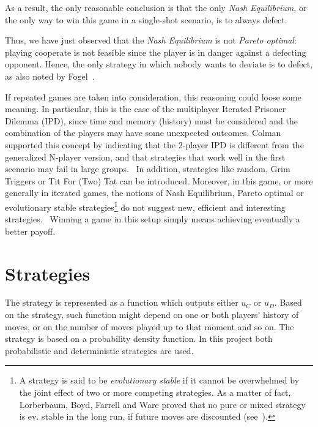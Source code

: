 \documentclass[journal,10pt,twoside]{IEEEtran}
\begin{document}
As a result, the only reasonable conclusion is that the only \textit{Nash Equilibrium}, or the only way to win this game in a single-shot scenario, is to always defect.

Thus, we have just observed that the \textit{Nash Equilibrium} is not \textit{Pareto optimal}: playing cooperate is not feasible since the player is in danger against a defecting opponent. Hence, the only strategy in which nobody wants to deviate is to defect, as also noted by Fogel~\cite{fogelEvolvingBehaviors}.

If repeated games are taken into consideration, this reasoning could loose some meaning. In particular, this is the case of the multiplayer Iterated Prisoner Dilemma (IPD), since time and memory (history) must be considered and the combination of the players may have some unexpected outcomes.
Colman supported this concept by indicating that the 2-player IPD is different from the generalized N-player version, and that strategies that work well in the first scenario may fail in large groups.~\cite{yao1994experimental}
In addition, strategies like random, Grim Triggers or Tit For (Two) Tat can be introduced.
Moreover, in this game, or more generally in iterated games, the notions of Nash Equilibrium, Pareto optimal or evolutionary stable strategies\footnote{A strategy is said to be \textit{evolutionary stable} if it cannot be overwhelmed by the joint effect of two or more competing strategies. As a matter of fact, Lorberbaum, Boyd, Farrell and Ware proved that no pure or mixed strategy is ev. stable in the long run, if future moves are discounted (see~\cite{lorb94}).} do not suggest new, efficient and interesting strategies.~\cite{mathieu2017}
Winning a game in this setup simply means achieving eventually a better payoff.

\section{Strategies} \label{s:str}
The strategy is represented as a function which outputs either $u_C$ or $u_D$. Based on the strategy, such function might depend on one or both players' history of moves, or on the number of moves played up to that moment and so on.
The strategy is based on a probability density function. In this project both probabilistic and deterministic strategies are used.
\end{document}
